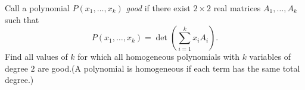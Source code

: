 \documentclass{article}
\begin{document}
\setlength{\parindent}{0pt}
Call a polynomial $P(x_{1},\dots,x_{k})$ \emph{good} if there exist $2\times2$ real matrices $A_{1},\dots,A_{k}$ such that$$P(x_{1},\dots,x_{k})=\det\left(\sum_{i=1}^{k}x_{i}A_{i}\right).$$Find all values of $k$ for which all homogeneous polynomials with $k$ variables of degree $2$ are good.\newline(A polynomial is homogeneous if each term has the same total degree.)
\end{document}
